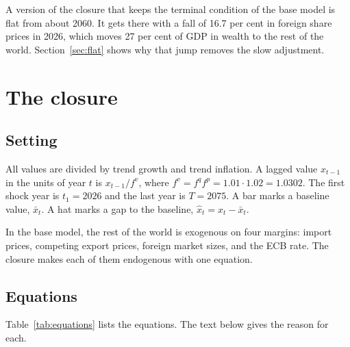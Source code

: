 \documentclass[11pt,a4paper]{article}
\begin{document}
A version of the closure that keeps the terminal condition of the base model is flat from about 2060.
It gets there with a fall of 16.7 per cent in foreign share prices in 2026, which moves 27 per cent of GDP in wealth to the rest of the world.
Section~\ref{sec:flat} shows why that jump removes the slow adjustment.

\section{The closure}

\subsection{Setting}

All values are divided by trend growth and trend inflation.
A lagged value $x_{t-1}$ in the units of year $t$ is $x_{t-1}/f^v$, where $f^v = f^q f^p = 1.01 \cdot 1.02 = 1.0302$.
The first shock year is $t_1 = 2026$ and the last year is $T = 2075$.
A bar marks a baseline value, $\bar{x}_t$. A hat marks a gap to the baseline, $\hat{x}_t = x_t - \bar{x}_t$.

In the base model, the rest of the world is exogenous on four margins: import prices, competing export prices, foreign market sizes, and the ECB rate.
The closure makes each of them endogenous with one equation.

\subsection{Equations}

Table~\ref{tab:equations} lists the equations. The text below gives the reason for each.
\end{document}
